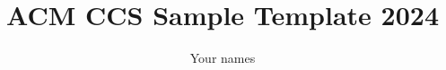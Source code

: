 \documentclass[sigconf]{acmart}
\begin{document}
\fancyhead{}
\def\thetitle{ACM CCS Sample Template 2024}
\title{\thetitle}

\author{Your names}

\date{}



\maketitle
{}










\appendix

\end{document}
